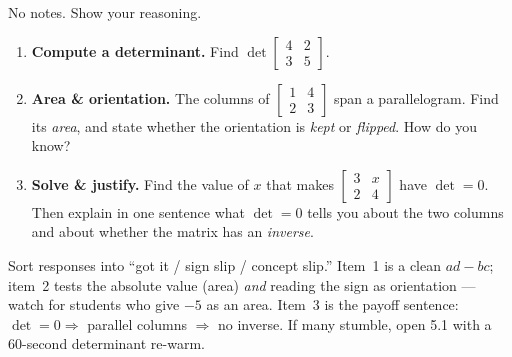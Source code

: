 \documentclass[10pt]{article}
\begin{document}
\namedateperiod

\vspace{0.15in}

No notes. Show your reasoning.

\begin{enumerate}[leftmargin=1.8em, itemsep=16pt]
  \item \textbf{Compute a determinant.} Find
        $\det\begin{bmatrix} 4 & 2 \\ 3 & 5 \end{bmatrix}$.
  \item \textbf{Area \& orientation.} The columns of $\begin{bmatrix} 1 & 4 \\ 2 & 3 \end{bmatrix}$ span
        a parallelogram. Find its \emph{area}, and state whether the orientation is \emph{kept} or
        \emph{flipped}. How do you know?
  \item \textbf{Solve \& justify.} Find the value of $x$ that makes
        $\begin{bmatrix} 3 & x \\ 2 & 4 \end{bmatrix}$ have $\det=0$. Then explain in one sentence what
        $\det=0$ tells you about the two columns and about whether the matrix has an \emph{inverse}.
\end{enumerate}

\begin{teachernote}
Sort responses into ``got it / sign slip / concept slip.'' Item~1 is a clean $ad-bc$; item~2 tests
the absolute value (area) \emph{and} reading the sign as orientation --- watch for students who give
$-5$ as an area. Item~3 is the payoff sentence: $\det=0\Rightarrow$ parallel columns $\Rightarrow$ no
inverse. If many stumble, open 5.1 with a 60-second determinant re-warm.
\end{teachernote}
\end{document}
